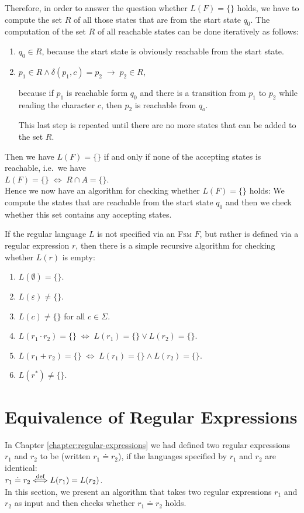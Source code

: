 Therefore, in order to answer the question whether $L(F) = \{\}$ holds, we have to compute the set $R$
of all those states that are  from the start state $q_0$.  The computation of the set $R$ of
all reachable states can be done iteratively as follows:
\begin{enumerate}
\item $q_0 \in R$, \quad because the start state is obviously reachable from the start state.
\item $p_1 \in R \wedge \delta(p_1,c) = p_2 \;\rightarrow\; p_2 \in R$,

      because if $p_1$ is reachable form $q_0$ and there is a transition from $p_1$ to $p_2$ while reading the
      character $c$, then $p_2$ is reachable from $q_o$.

      This last step is repeated until there are no more states that can be added to the set $R$.
\end{enumerate}
Then we have $L(F) = \{\}$ if and only if none of the accepting states is reachable, i.e.~we have
\\[0.2cm]
\hspace*{1.3cm}
$L(F) = \{\} \;\Leftrightarrow\; R \cap A = \{\}$.
\\[0.2cm]
Hence we now have an algorithm for checking whether $L(F) = \{\}$ holds:
We compute the states that are reachable from the start state $q_0$ and then we check whether this set
contains any accepting states.

\remarkEng
If the regular language  $L$ is not specified via an \textsc{Fsm} $F$, but rather is defined
via a regular expression $r$, then there is a simple recursive algorithm for checking whether 
$L(r)$ is empty:
\begin{enumerate}
\item $L(\emptyset) = \{\}$.
\item $L(\varepsilon) \not= \{\}$.
\item $L(c) \not= \{\}$ \quad for all $c \in \Sigma$.
\item $L(r_1 \cdot r_2) = \{\} \;\Leftrightarrow\; L(r_1) = \{\} \vee L(r_2) = \{\}$.
\item $L(r_1 + r_2) = \{\} \;\Leftrightarrow\; L(r_1) = \{\} \wedge L(r_2) = \{\}$.
\item $L(r^*) \not= \{\}$. \eox
\end{enumerate}


\section{Equivalence of Regular Expressions}
In Chapter \ref{chapter:regular-expressions} we had defined two regular expressions $r_1$ and $r_2$ to be  
(written $r_1 \doteq r_2$), if the languages specified by $r_1$ and $r_2$ are identical:
\\[0.2cm]
\hspace*{1.3cm}
$r_1 \doteq r_2 \stackrel{\mbox{\scriptsize def}}{\Longleftrightarrow} L(r_1) = L(r_2)$. 
\\[0.2cm]
In this section, we present an algorithm that takes two regular expressions $r_1$ and $r_2$ as input and then
checks whether $r_1 \doteq r_2$ holds. 


